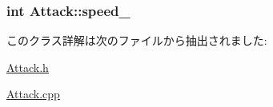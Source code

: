\hypertarget{class_attack_a1baab21d135d9b9c7c4072b303c58963}{
\subsubsection[{speed\+\_\+}]{\setlength{\rightskip}{0pt plus 5cm}int Attack\+::speed\+\_\+\hspace{0.3cm}{\ttfamily [protected]}}}\label{class_attack_a1baab21d135d9b9c7c4072b303c58963}


このクラス詳解は次のファイルから抽出されました\+:\begin{DoxyCompactItemize}
\item 
\hyperlink{_attack_8h}{Attack.\+h}\item 
\hyperlink{_attack_8cpp}{Attack.\+cpp}\end{DoxyCompactItemize}

